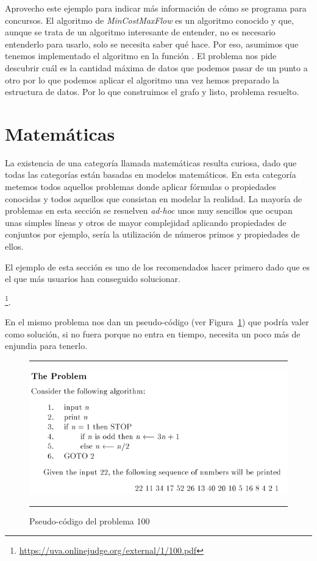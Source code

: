 Aprovecho este ejemplo para indicar más información de cómo se
programa para concursos. El algoritmo de \emph{MinCostMaxFlow} es un
algoritmo conocido y que, aunque se trata de un algoritmo interesante
de entender, no es necesario entenderlo para usarlo, solo se necesita
saber qué hace. Por eso, asumimos que tenemos implementado el
algoritmo en la función . El problema nos pide descubrir cuál es
la cantidad máxima de datos que podemos pasar de un punto a otro por
lo que podemos aplicar el algoritmo una vez hemos preparado la
estructura de datos. Por lo que construimos el grafo y listo, problema
resuelto.

\section{Matemáticas}
\label{sec:matematicas}

La existencia de una categoría llamada matemáticas resulta curiosa,
dado que todas las categorías están basadas en modelos matemáticos. En
esta categoría metemos todos aquellos problemas donde aplicar fórmulas
o propiedades conocidas y todos aquellos que consistan en modelar la
realidad. La mayoría de problemas en esta sección se resuelven
\emph{ad-hoc} unos muy sencillos que ocupan unas simples líneas y
otros de mayor complejidad aplicando propiedades de conjuntos por
ejemplo, sería la utilización de números primos y propiedades de
ellos.

El ejemplo de esta sección es uno de los recomendados hacer primero
dado que es el que más usuarios han conseguido solucionar.

\footnote{\url{https://uva.onlinejudge.org/external/1/100.pdf}}.

En el mismo problema nos dan un pseudo-código (ver
Figura~\ref{fig:problema100}) que podría valer como solución, si no
fuera porque no entra en tiempo, necesita un poco más de enjundia para
tenerlo.

\begin{figure}[h]
\hrule\smallskip
\begin{center}
\includegraphics[width=1\textwidth]{fig/problema100.png}
\end{center}
\caption{Pseudo-código del problema 100}
\label{fig:problema100}
\hrule
\end{figure}

